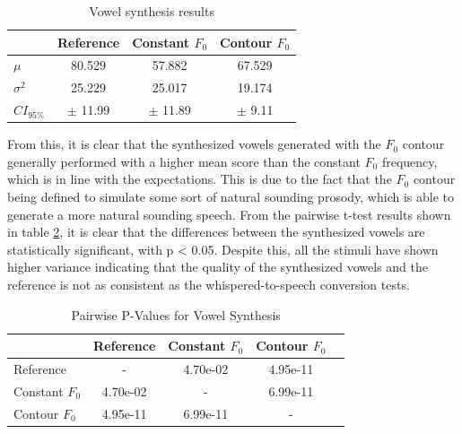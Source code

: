 \begin{table}[H]
    \centering
    \begin{tabular}{lccc}
        \hline
        & Reference & Constant $F_0$ & Contour $F_0$ \\
        \hline

        $\mu$ & 80.529 & 57.882 & 67.529 \\ %
        $\sigma^2$ & 25.229 & 25.017 & 19.174 \\
        $CI_{95\%}$ & $\pm$ 11.99 & $\pm$ 11.89 & $\pm$ 9.11 \\ \hline
    
    \end{tabular}
    \caption{Vowel synthesis results}
    \label{tab:vowelSynth}
\end{table}

From this, it is clear that the synthesized vowels generated with the $F_0$ contour generally performed with a higher mean score than the constant $F_0$ frequency, which is in line with the expectations. This is due to the fact that the $F_0$ contour being defined to simulate some sort of natural sounding prosody, which is able to generate a more natural sounding speech. From the pairwise t-test results shown in table \ref{tab:pairwiseVowel}, it is clear that the differences between the synthesized vowels are statistically significant, with p < 0.05. Despite this, all the stimuli have shown higher variance indicating that the quality of the synthesized vowels and the reference is not as consistent as the whispered-to-speech conversion tests.

\begin{table}[H]
    \centering
    \begin{tabular}{lcccc}
        \hline
        & Reference & Constant $F_0$ & Contour $F_0$ \\
        \hline
        Reference & - & 4.70e-02 & 4.95e-11 \\
        Constant $F_0$ & 4.70e-02 & - & 6.99e-11 \\
        Contour $F_0$ & 4.95e-11 & 6.99e-11 & - \\
        \hline
    \end{tabular}
    \caption{Pairwise P-Values for Vowel Synthesis}
    \label{tab:pairwiseVowel}
\end{table}


